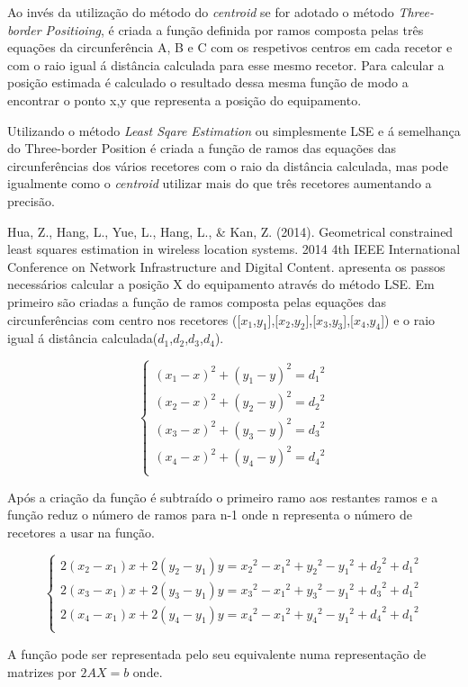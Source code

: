 Ao invés da utilização do método do \textit{centroid} se for adotado o método \textit{Three-border Positioing}, é criada a função definida por ramos composta pelas três equações da circunferência A, B e C com os respetivos centros em cada recetor e com o raio igual á distância calculada para esse mesmo recetor. Para calcular a posição estimada é calculado o resultado dessa mesma função de modo a encontrar o ponto x,y que representa a posição do equipamento.
\par 
Utilizando o método \textit{Least Sqare Estimation} ou simplesmente LSE e á semelhança do Three-border Position\cite{Zhu2014} é criada a função de ramos das equações das circunferências dos vários recetores com o raio da distância calculada, mas pode igualmente como o \textit{centroid} utilizar mais do que três recetores aumentando a precisão. \par Hua, Z., Hang, L., Yue, L., Hang, L., \& Kan, Z. (2014). Geometrical constrained least squares estimation in wireless location systems. 2014 4th IEEE International Conference on Network Infrastructure and Digital Content. apresenta os passos necessários calcular a posição X do equipamento através do método LSE. Em primeiro são criadas a função de ramos composta pelas equações das circunferências com centro nos recetores ([$x_{1}$,$y_{1}$],[$x_{2}$,$y_{2}$],[$x_{3}$,$y_{3}$],[$x_{4}$,$y_{4}$]) e o raio igual á distância calculada($d_{1}$,$d_{2}$,$d_{3}$,$d_{4}$).
\begin{center}
\[
\begin{cases}
(x_{1} -x)^2 + (y_{1}-y)^2 = {d_{1}}^2\\
(x_{2} -x)^2 + (y_{2}-y)^2 = {d_{2}}^2\\
(x_{3} -x)^2 + (y_{3}-y)^2 = {d_{3}}^2\\
(x_{4} -x)^2 + (y_{4}-y)^2 = {d_{4}}^2\\
\end{cases}
\]
\end{center}

\par Após a criação da função é subtraído o primeiro ramo aos restantes ramos e a função reduz o número de ramos para n-1 onde n representa o número de recetores a usar na função.
\begin{center}

\[
\begin{cases}
2(x_{2}-x_{1})x+2(y_{2}-y_{1})y={x_{2}}^2-{x_{1}}^2+{y_{2}}^2-{y_{1}}^2+{d_{2}}^2+{ d_{1}}^2\\
2(x_{3}-x_{1})x+2(y_{3}-y_{1})y={x_{3}}^2-{x_{1}}^2+{y_{3}}^2-{y_{1}}^2+{d_{3}}^2+{ d_{1}}^2\\
2(x_{4}-x_{1})x+2(y_{4}-y_{1})y={x_{4}}^2-{x_{1}}^2+{y_{4}}^2-{y_{1}}^2+{d_{4}}^2+{ d_{1}}^2\\
\end{cases}
\]
\end{center}
\par A função pode ser representada pelo seu equivalente numa representação de matrizes por $2AX = b$ onde.

